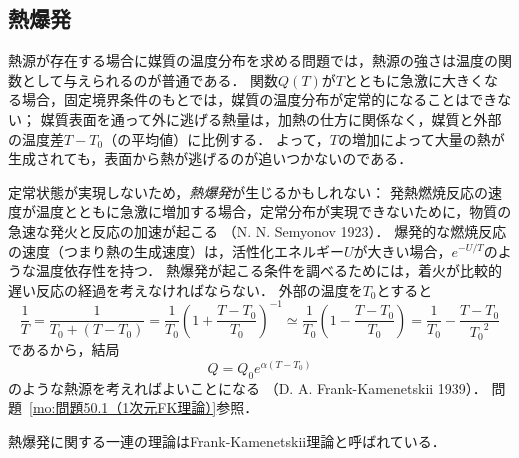\subsection*{熱爆発}
熱源が存在する場合に媒質の温度分布を求める問題では，熱源の強さは温度の関数として与えられるのが普通である．
関数$Q(T)$が$T$とともに急激に大きくなる場合，固定境界条件のもとでは，媒質の温度分布が定常的になることはできない；
媒質表面を通って外に逃げる熱量は，加熱の仕方に関係なく，媒質と外部の温度差$T-T_0$（の平均値）に比例する．
よって，$T$の増加によって大量の熱が生成されても，表面から熱が逃げるのが追いつかないのである．


定常状態が実現しないため，\emph{熱爆発}が生じるかもしれない：
発熱燃焼反応の速度が温度とともに急激に増加する場合，定常分布が実現できないために，物質の急速な発火と反応の加速が起こる
（N. N. Semyonov 1923）．
爆発的な燃焼反応の速度（つまり熱の生成速度）は，活性化エネルギー$U$が大きい場合，$e^{-U/T}$のような温度依存性を持つ．
熱爆発が起こる条件を調べるためには，着火が比較的遅い反応の経過を考えなければならない．
外部の温度を$T_0$とすると
\[
    \frac{1}{T} = \frac{1}{T_0 + (T-T_0)} = \frac{1}{T_0} \left( 1 + \frac{T-T_0}{T_0} \right)^{-1}
    \simeq \frac{1}{T_0} \left( 1 - \frac{T-T_0}{T_0} \right) = \frac{1}{T_0} - \frac{T-T_0}{{T_0}^2}
\]
であるから，結局
\begin{equation}\label{eq50.11:指数的温度依存性を持つ熱源}
    Q = Q_0 e^{\alpha(T-T_0)}
\end{equation}
のような熱源を考えればよいことになる
（D. A. Frank-Kamenetskii 1939）．
問題~\ref{mo:問題50.1（1次元FK理論）}参照．


\begin{details}
熱爆発に関する一連の理論はFrank-Kamenetskii理論と呼ばれている．
\end{details}




